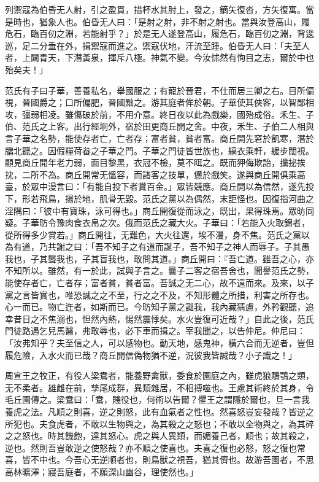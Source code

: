 \begin{pinyinscope}
列禦寇為伯昏无人射，引之盈貫，措杯水其肘上，發之，鏑矢復沓，方矢復寓。當是時也，猶象人也。伯昏无人曰：「是射之射，非不射之射也。當與汝登高山，履危石，臨百仞之淵，若能射乎？」於是无人遂登高山，履危石，臨百仞之淵，背逡巡，足二分垂在外，揖禦寇而進之。禦寇伏地，汗流至踵。伯昏无人曰：「夫至人者，上闚青天，下潛黃泉，揮斥八極。神氣不變。今汝怵然有恂目之志，爾於中也殆矣夫！」

范氏有子曰子華，善養私名，舉國服之；有寵於晉君，不仕而居三卿之右。目所偏視，晉國爵之；口所偏肥，晉國黜之。游其庭者侔於朝。子華使其俠客，以智鄙相攻，彊弱相凌。雖傷破於前，不用介意。終日夜以此為戲樂，國殆成俗。禾生、子伯、范氏之上客。出行經坰外，宿於田更商丘開之舍。中夜，禾生、子伯二人相與言子華之名勢，能使存者亡，亡者存；富者貧，貧者富。商丘開先窘於飢寒，潛於牖北聽之。因假糧荷畚之子華之門。子華之門徒皆世族也，縞衣乘軒，緩步闊視。顧見商丘開年老力弱，面目黎黑，衣冠不檢，莫不眲之。既而狎侮欺詒，攩㧙挨抌，二所不為。商丘開常无慍容，而諸客之技單，憊於戲笑。遂與商丘開俱乘高臺，於眾中漫言曰：「有能自投下者賞百金。」眾皆競應。商丘開以為信然，遂先投下，形若飛鳥，揚於地，肌骨无毀。范氏之黨以為偶然，末詎怪也。因復指河曲之淫隅曰：「彼中有寶珠，泳可得也。」商丘開復從而泳之，既出，果得珠焉。眾昉同疑。子華昉令豫肉食衣帛之次。俄而范氏之藏大火。子華曰：「若能入火取錦者，從所得多少賞若。」商丘開往，无難色，大火往還，埃不漫，身不焦。范氏之黨以為有道，乃共謝之曰：「吾不知子之有道而誕子，吾不知子之神人而辱子。子其愚我也，子其聾我也，子其盲我也，敢問其道。」商丘開曰：『吾亡道。雖吾之心，亦不知所以。雖然，有一於此，試與子言之。曩子二客之宿吾舍也，聞譽范氏之勢，能使存者亡，亡者存；富者貧，貧者富。吾誠之无二心，故不遠而來。及來，以子黨之言皆實也，唯恐誠之之不至，行之之不及，不知形體之所措，利害之所存也。心一而已。物亡迕者，如斯而已。今昉知子黨之誕我，我內藏猜慮，外矜觀聽，追幸昔日之不焦溺也，怛然內熱，惕然震悸矣。水火豈復可近哉？」自此之後，范氏門徒路遇乞兒馬醫，弗敢辱也，必下車而揖之。宰我聞之，以告仲尼。仲尼曰：「汝弗知乎？夫至信之人，可以感物也。動天地，感鬼神，橫六合而无逆者，豈但履危險，入水火而已哉？商丘開信偽物猶不逆，況彼我皆誠哉？小子識之！」

周宣王之牧正，有役人梁鴦者，能養野禽獸，委食於園庭之內，雖虎狼鵰鶚之類，无不柔者。雄雌在前，孳尾成群，異類雜居，不相搏噬也。王慮其術終於其身，令毛丘園傳之。梁鴦曰：「鴦，賤役也，何術以告爾？懼王之謂隱於爾也，旦一言我養虎之法。凡順之則喜，逆之則怒，此有血氣者之性也。然喜怒豈妄發哉？皆逆之所犯也。夫食虎者，不敢以生物與之，為其殺之之怒也；不敢以全物與之，為其碎之之怒也。時其饑飽，達其怒心。虎之與人異類，而媚養己者，順也；故其殺之，逆也。然則吾豈敢逆之使怒哉？亦不順之使喜也。夫喜之復也必怒，怒之復也常喜，皆不中也。今吾心无逆順者也，則鳥獸之視吾，猶其儕也。故游吾園者，不思高林曠澤；寢吾庭者，不願深山幽谷，理使然也。」


\end{pinyinscope}
